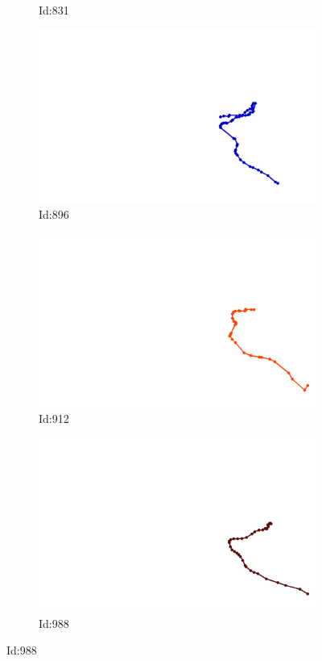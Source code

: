 \documentclass[12pt,twoside]{report}
\begin{document}
\begin{figure}
\begin{subfigure}[b]{0.20\textwidth}
\caption{Id:831}
\end{subfigure}
\begin{subfigure}[b]{0.20\textwidth}
\centering
\includegraphics[width=\textwidth]{../../trajectories/896.png}
\caption{Id:896}
\end{subfigure}
\begin{subfigure}[b]{0.20\textwidth}
\centering
\includegraphics[width=\textwidth]{../../trajectories/912.png}
\caption{Id:912}
\end{subfigure}
\begin{subfigure}[b]{0.20\textwidth}
\centering
\includegraphics[width=\textwidth]{../../trajectories/988.png}
\caption{Id:988}
\end{subfigure}
\end{figure}
\end{document}
